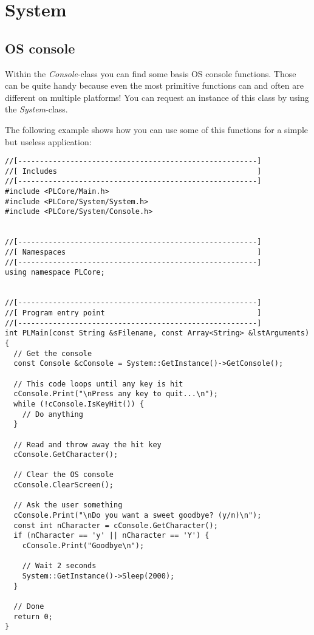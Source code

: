 \section{System}




\subsection{OS console}
Within the \emph{Console}-class you can find some basis OS console functions. Those can be quite handy because even the most primitive functions can and often are different on multiple platforms! You can request an instance of this class by using the \emph{System}-class.

The following example shows how you can use some of this functions for a simple but useless application:

\begin{lstlisting}[caption=OS console usage example]
//[-------------------------------------------------------]
//[ Includes                                              ]
//[-------------------------------------------------------]
#include <PLCore/Main.h>
#include <PLCore/System/System.h>
#include <PLCore/System/Console.h>


//[-------------------------------------------------------]
//[ Namespaces                                            ]
//[-------------------------------------------------------]
using namespace PLCore;


//[-------------------------------------------------------]
//[ Program entry point                                   ]
//[-------------------------------------------------------]
int PLMain(const String &sFilename, const Array<String> &lstArguments)
{
  // Get the console
  const Console &cConsole = System::GetInstance()->GetConsole();

  // This code loops until any key is hit
  cConsole.Print("\nPress any key to quit...\n");
  while (!cConsole.IsKeyHit()) {
    // Do anything
  }

  // Read and throw away the hit key
  cConsole.GetCharacter();

  // Clear the OS console
  cConsole.ClearScreen();

  // Ask the user something
  cConsole.Print("\nDo you want a sweet goodbye? (y/n)\n");
  const int nCharacter = cConsole.GetCharacter();
  if (nCharacter == 'y' || nCharacter == 'Y') {
    cConsole.Print("Goodbye\n");

    // Wait 2 seconds
    System::GetInstance()->Sleep(2000);
  }

  // Done
  return 0;
}
\end{lstlisting}
